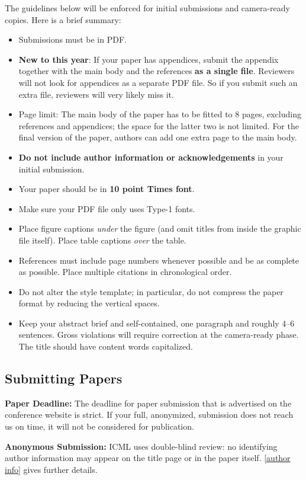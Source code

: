 \documentclass{article}
\theoremstyle{plain}
\theoremstyle{definition}
\theoremstyle{remark}
\begin{document}
The guidelines below will be enforced for initial submissions and
camera-ready copies. Here is a brief summary:
\begin{itemize}
\item Submissions must be in PDF\@. 
\item \textbf{New to this year}: If your paper has appendices, submit the appendix together with the main body and the references \textbf{as a single file}. Reviewers will not look for appendices as a separate PDF file. So if you submit such an extra file, reviewers will very likely miss it.
\item Page limit: The main body of the paper has to be fitted to 8 pages, excluding references and appendices; the space for the latter two is not limited. For the final version of the paper, authors can add one extra page to the main body.
\item \textbf{Do not include author information or acknowledgements} in your
    initial submission.
\item Your paper should be in \textbf{10 point Times font}.
\item Make sure your PDF file only uses Type-1 fonts.
\item Place figure captions \emph{under} the figure (and omit titles from inside
    the graphic file itself). Place table captions \emph{over} the table.
\item References must include page numbers whenever possible and be as complete
    as possible. Place multiple citations in chronological order.
\item Do not alter the style template; in particular, do not compress the paper
    format by reducing the vertical spaces.
\item Keep your abstract brief and self-contained, one paragraph and roughly
    4--6 sentences. Gross violations will require correction at the
    camera-ready phase. The title should have content words capitalized.
\end{itemize}

\subsection{Submitting Papers}

\textbf{Paper Deadline:} The deadline for paper submission that is
advertised on the conference website is strict. If your full,
anonymized, submission does not reach us on time, it will not be
considered for publication. 

\textbf{Anonymous Submission:} ICML uses double-blind review: no identifying
author information may appear on the title page or in the paper
itself. \cref{author info} gives further details.
\end{document}
